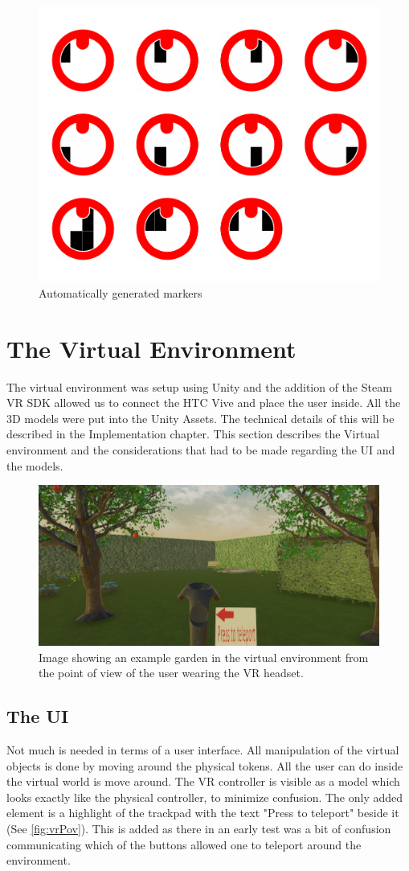 \begin{figure}[H]
	\centering
	\includegraphics[width=0.7\linewidth]{figure/Analysis/result}
	\caption{Automatically generated markers}
	\label{fig:result}
\end{figure}


\section{The Virtual Environment}
The virtual environment was setup using Unity and the addition of the Steam VR SDK allowed us to connect the HTC Vive and place the user inside. All the 3D models were put into the Unity Assets. The technical details of this will be described in the Implementation chapter. This section describes the Virtual environment and the considerations that had to be made regarding the UI and the models.

\begin{figure}[H]
	\centering
	\includegraphics[width=0.9\linewidth]{figure/Design/vrPov.png}
	\caption{Image showing an example garden in the virtual environment from the point of view of the user wearing the VR headset.}
	\label{fig:vrPov}
\end{figure}


\subsection{The UI}
Not much is needed in terms of a user interface. All manipulation of the virtual objects is done by moving around the physical tokens. All the user can do inside the virtual world is move around. The VR controller is visible as a model which looks exactly like the physical controller, to minimize confusion. The only added element is a highlight of the trackpad with the text "Press to teleport" beside it (See \autoref{fig:vrPov}). This is added as there in an early test was a bit of confusion communicating which of the buttons allowed one to teleport around the environment.

